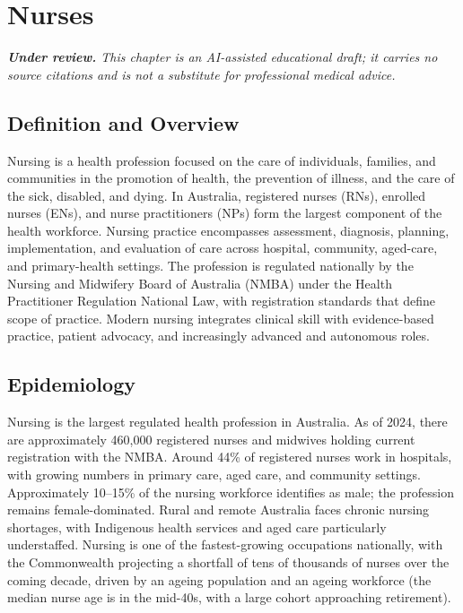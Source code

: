 \chapter{Nurses}

\medskip
\noindent\textit{\textbf{Under review.} This chapter is an AI-assisted educational draft; it carries no source citations and is not a substitute for professional medical advice.}

\section*{Definition and Overview}
Nursing is a health profession focused on the care of individuals, families, and communities in the promotion of health, the prevention of illness, and the care of the sick, disabled, and dying. In Australia, registered nurses (RNs), enrolled nurses (ENs), and nurse practitioners (NPs) form the largest component of the health workforce. Nursing practice encompasses assessment, diagnosis, planning, implementation, and evaluation of care across hospital, community, aged-care, and primary-health settings. The profession is regulated nationally by the Nursing and Midwifery Board of Australia (NMBA) under the Health Practitioner Regulation National Law, with registration standards that define scope of practice. Modern nursing integrates clinical skill with evidence-based practice, patient advocacy, and increasingly advanced and autonomous roles.

\section*{Epidemiology}
Nursing is the largest regulated health profession in Australia. As of 2024, there are approximately 460,000 registered nurses and midwives holding current registration with the NMBA. Around 44\% of registered nurses work in hospitals, with growing numbers in primary care, aged care, and community settings. Approximately 10--15\% of the nursing workforce identifies as male; the profession remains female-dominated. Rural and remote Australia faces chronic nursing shortages, with Indigenous health services and aged care particularly understaffed. Nursing is one of the fastest-growing occupations nationally, with the Commonwealth projecting a shortfall of tens of thousands of nurses over the coming decade, driven by an ageing population and an ageing workforce (the median nurse age is in the mid-40s, with a large cohort approaching retirement).

